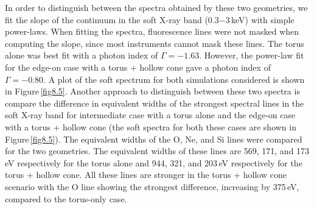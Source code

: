\documentclass[fleqn,usenatbib]{mnras}
\begin{document}
            In order to distinguish between the spectra obtained by these two geometries, we fit the slope of the continuum in the soft X-ray band (0.3$-$3\,keV) with simple power-laws. When fitting the spectra, fluorescence lines were not masked when computing the slope, since most instruments cannot mask these lines. The torus alone was best fit with a photon index of $\Gamma = -1.63$. However, the power-law  fit for the edge-on case with a torus + hollow cone gave a photon index of $\Gamma = -0.80$. A plot of the soft spectrum for both simulations considered is shown in Figure\,\ref{fig8.5}. Another approach to distinguish between these two spectra is compare the difference in equivalent widths of the strongest spectral lines in the soft X-ray band for intermediate case with a torus alone and the edge-on case with a torus + hollow cone (the soft spectra for both these cases are shown in Figure\,\ref{fig8.5}). The equivalent widths of the O, Ne, and Si lines were compared for the two geometries. The equivalent widths of these lines are 569, 171, and 173\,eV respectively for the torus alone and 944, 321, and 203\,eV respectively for the torus + hollow cone. All these lines are stronger in the torus + hollow cone scenario with the O line showing the strongest difference, increasing by 375\,eV, compared to the torus-only case.
            
\end{document}
